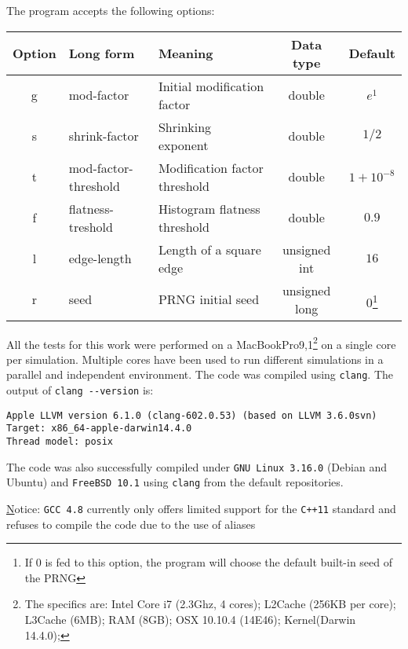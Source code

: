 \documentclass[11pt]{article}
\begin{document}
The program accepts the following options:
\begin{center}\begin{tabular}{cllcc}
\toprule
Option	&	Long form				&	Meaning							& Data type			& Default		\\
\midrule
g 		&	mod-factor				&	Initial modification factor		& double			& $e^1$			\\
s 		&	shrink-factor			&	Shrinking exponent				& double			& $1/2$			\\
t 		&	mod-factor-threshold	&	Modification factor threshold	& double			& $1 + 10^{-8}$	\\
f 		&	flatness-treshold		&	Histogram flatness threshold	& double 			& $0.9$			\\
l 		&	edge-length				&	Length of a square edge			& unsigned int		& $16$			\\
r 		&	seed					&	PRNG initial seed				& unsigned long		& $0$\footnote{If $0$ is fed to this option, the program will choose the default built-in seed of the PRNG}			\\
\bottomrule
\end{tabular}\end{center}

All the tests for this work were performed on a MacBookPro9,1\footnote{The specifics are: 
Intel Core i7 (2.3Ghz, 4 cores); L2Cache (256KB per core); L3Cache (6MB); RAM (8GB); OSX 10.10.4 (14E46); Kernel(Darwin 14.4.0);} on a single core per simulation. Multiple cores have been used to run different simulations in a parallel and independent environment. The code was compiled using \verb|clang|. The output of \verb|clang --version| is: \begin{verbatim}
Apple LLVM version 6.1.0 (clang-602.0.53) (based on LLVM 3.6.0svn)
Target: x86_64-apple-darwin14.4.0
Thread model: posix
\end{verbatim}

The code was also successfully compiled under \verb|GNU Linux 3.16.0| (Debian and Ubuntu)  and \verb|FreeBSD 10.1| using \verb|clang| from the default repositories.

{\underline Notice:} \verb|GCC 4.8| currently only offers limited support for the \verb|C++11| standard and refuses to compile the code due to the use of aliases
\end{document}
